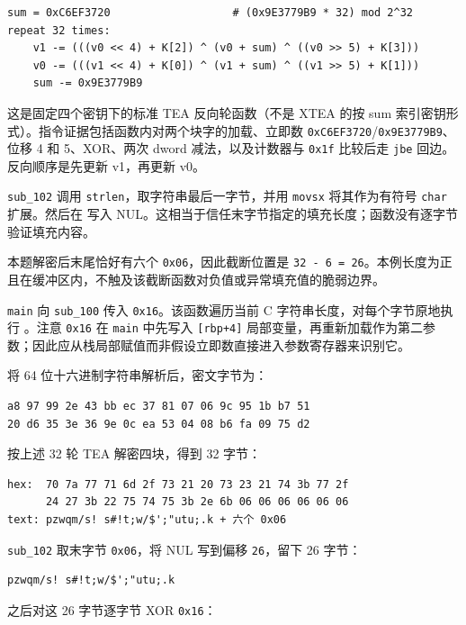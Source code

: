\begin{verbatim}
sum = 0xC6EF3720                   # (0x9E3779B9 * 32) mod 2^32
repeat 32 times:
    v1 -= (((v0 << 4) + K[2]) ^ (v0 + sum) ^ ((v0 >> 5) + K[3]))
    v0 -= (((v1 << 4) + K[0]) ^ (v1 + sum) ^ ((v1 >> 5) + K[1]))
    sum -= 0x9E3779B9
\end{verbatim}

这是固定四个密钥下的标准 TEA 反向轮函数（不是 XTEA 的按 sum 索引密钥形式）。指令证据包括函数内对两个块字的加载、立即数 \texttt{0xC6EF3720}/\texttt{0x9E3779B9}、位移 4 和 5、XOR、两次 dword 减法，以及计数器与 \texttt{0x1f} 比较后走 \texttt{jbe} 回边。反向顺序是先更新 v1，再更新 v0。

\texttt{sub\_102} 调用 \texttt{strlen}，取字符串最后一字节，并用 \texttt{movsx} 将其作为有符号 \texttt{char} 扩展。然后在 \texttt{} 写入 NUL。这相当于信任末字节指定的填充长度；函数没有逐字节验证填充内容。

本题解密后末尾恰好有六个 \texttt{0x06}，因此截断位置是 \texttt{32\ -\ 6\ =\ 26}。本例长度为正且在缓冲区内，不触及该截断函数对负值或异常填充值的脆弱边界。

\texttt{main} 向 \texttt{sub\_100} 传入 \texttt{0x16}。该函数遍历当前 C 字符串长度，对每个字节原地执行 \texttt{}。注意 \texttt{0x16} 在 \texttt{main} 中先写入 \texttt{{[}rbp+4{]}} 局部变量，再重新加载作为第二参数；因此应从栈局部赋值而非假设立即数直接进入参数寄存器来识别它。

将 64 位十六进制字符串解析后，密文字节为：

\begin{verbatim}
a8 97 99 2e 43 bb ec 37 81 07 06 9c 95 1b b7 51
20 d6 35 3e 36 9e 0c ea 53 04 08 b6 fa 09 75 d2
\end{verbatim}

按上述 32 轮 TEA 解密四块，得到 32 字节：

\begin{verbatim}
hex:  70 7a 77 71 6d 2f 73 21 20 73 23 21 74 3b 77 2f
      24 27 3b 22 75 74 75 3b 2e 6b 06 06 06 06 06 06
text: pzwqm/s! s#!t;w/$';"utu;.k + 六个 0x06
\end{verbatim}

\texttt{sub\_102} 取末字节 \texttt{0x06}，将 NUL 写到偏移 \texttt{26}，留下 26 字节：

\begin{verbatim}
pzwqm/s! s#!t;w/$';"utu;.k
\end{verbatim}

之后对这 26 字节逐字节 XOR \texttt{0x16}：

